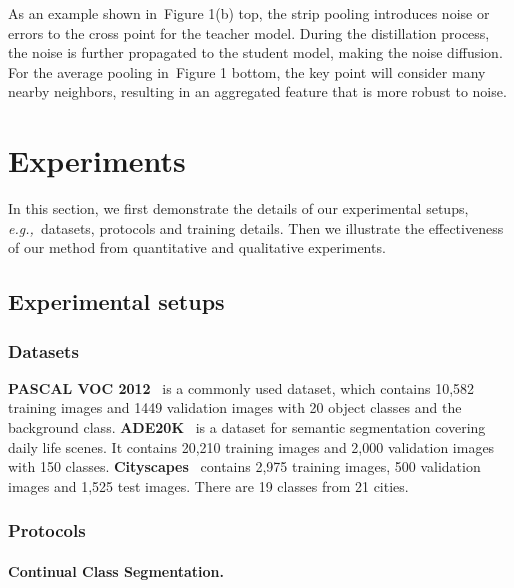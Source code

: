 \documentclass[10pt,twocolumn,letterpaper]{article}
\newcommand{\figref}[1]{Figure 1}\newcommand{\tabref}[1]{Table 1}\newcommand{\secref}[1]{Section 1}
\newcommand{\figref}[1]{Fig.~\ref{#1}}\newcommand{\tabref}[1]{Tab.~\ref{#1}}\newcommand{\secref}[1]{Sec.~\ref{#1}}
\def\eg{\emph{e.g.,~}}
\begin{document}
As an example shown in~\figref{fig:kd-motivation}(b) top,
the strip pooling introduces noise or errors to the cross point for the teacher model.
During the distillation process,
the noise is further propagated to the student model,
making the noise diffusion.
For the average pooling in~\figref{fig:kd-motivation} bottom,
the key point will consider many nearby neighbors, resulting in an aggregated feature that is more robust to noise.














\section{Experiments}
In this section, we first demonstrate the details of our experimental setups, \eg{datasets, protocols and training details.}
Then we illustrate the effectiveness of our method from quantitative and qualitative experiments.


\subsection{Experimental setups}
\subsubsection{Datasets}

\textbf{PASCAL VOC 2012}~\cite{pascal-voc-2012}
is a commonly used dataset,
which contains 10,582 training images and 1449 validation images with 20 object classes and the background class.
\textbf{ADE20K}~\cite{zhou2017scene} is a dataset for semantic segmentation
covering daily life scenes.
It contains 20,210 training images and 2,000 validation images with 150 classes.
\textbf{Cityscapes}~\cite{cordts2016cityscapes}
contains 2,975 training images,
500 validation images and 1,525 test images.
There are 19 classes from 21 cities.





\subsubsection{Protocols}
\paragraph{Continual Class Segmentation.}
\end{document}
